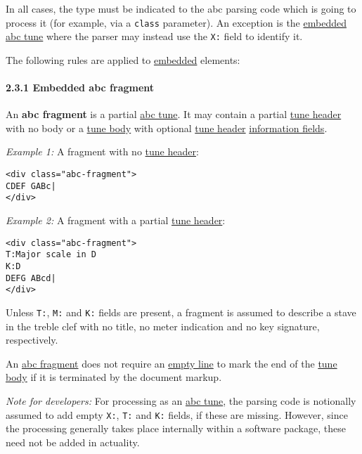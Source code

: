 In all cases, the type must be indicated to the abc parsing code which
is going to process it (for example, via a \texttt{class} parameter). An
exception is the \protect\hyperlink{embedded_definition}{embedded}
\protect\hyperlink{abc_tune_definition}{abc tune} where the parser may
instead use the \texttt{X:} field to identify it.

The following rules are applied to
\protect\hyperlink{embedded_definition}{embedded} elements:

\hypertarget{embedded_abc_fragment}{\paragraph{2.3.1 Embedded abc
fragment}\label{embedded_abc_fragment}}

An \href{}{}\textbf{abc fragment} is a partial
\protect\hyperlink{abc_tune_definition}{abc tune}. It may contain a
partial \protect\hyperlink{tune_header_definition}{tune header} with no
body or a \protect\hyperlink{tune_body_definition}{tune body} with
optional \protect\hyperlink{tune_header_definition}{tune header}
\protect\hyperlink{information_field_definition}{information fields}.

\emph{Example 1:} A fragment with no
\protect\hyperlink{tune_header_definition}{tune header}:

\begin{verbatim}
<div class="abc-fragment">
CDEF GABc|
</div>
\end{verbatim}

\emph{Example 2:} A fragment with a partial
\protect\hyperlink{tune_header_definition}{tune header}:

\begin{verbatim}
<div class="abc-fragment">
T:Major scale in D
K:D
DEFG ABcd|
</div>
\end{verbatim}

Unless \texttt{T:}, \texttt{M:} and \texttt{K:} fields are present, a
fragment is assumed to describe a stave in the treble clef with no
title, no meter indication and no key signature, respectively.

An \protect\hyperlink{abc_fragment_definition}{abc fragment} does not
require an \protect\hyperlink{empty_line_definition}{empty line} to mark
the end of the \protect\hyperlink{tune_body_definition}{tune body} if it
is terminated by the document markup.

\emph{Note for developers:} For processing as an
\protect\hyperlink{abc_tune_definition}{abc tune}, the parsing code is
notionally assumed to add empty \texttt{X:}, \texttt{T:} and \texttt{K:}
fields, if these are missing. However, since the processing generally
takes place internally within a software package, these need not be
added in actuality.

